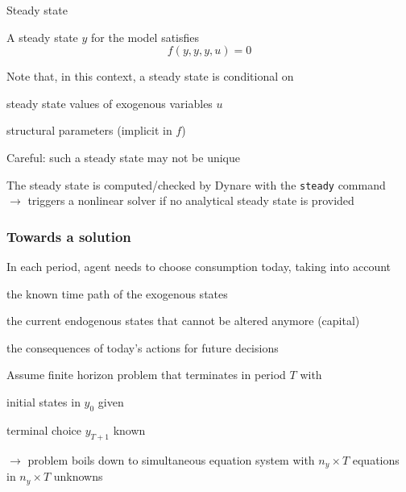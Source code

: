 \documentclass[handout,usepdftitle=false,xcolor=dvipsnames,aspectratio=169]{beamer}
\begin{document}
\begin{frame}{Steady state}
  \begin{witemize}
    \item A steady state $y$ for the model satisfies
    \begin{equation}
      f(y, y, y, u) = 0
    \end{equation}

    \item Note that, in this context, a steady state is conditional on
    \begin{witemize}
      \item steady state values of exogenous variables $u$
      \item structural parameters (implicit in $f$)
    \end{witemize}

    \item Careful: such a steady state may not be unique
    \item The steady state is computed/checked by Dynare with the \texttt{steady} command\\
    $\rightarrow$ triggers a nonlinear solver if no analytical steady state is provided
  \end{witemize}

\end{frame}


\begin{frame}
  \frametitle{Towards a solution}
  \begin{witemize}
    \item In each period, agent needs to choose consumption today, taking into account
    \begin{witemize}
      \item the known time path of the exogenous states
      \item the current endogenous states that cannot be altered anymore (capital)
      \item the consequences of today's actions for future decisions
    \end{witemize}
    \item Assume finite horizon problem that terminates in period $T$ with
    \begin{witemize}
      \item initial states in $y_0$ given
      \item terminal choice $y_{T+1}$ known
    \end{witemize}
    $\rightarrow$ problem boils down to simultaneous equation system with $n_y\times T$ equations in $n_y\times T$ unknowns
  \end{witemize}

\end{frame}
\end{document}
